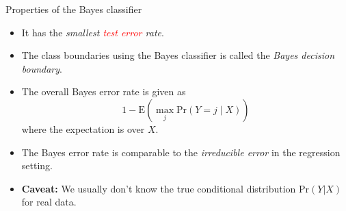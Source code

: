 \documentclass[
  10pt,
  ignorenonframetext,
]{beamer}
\providecommand{\tightlist}{%
  \setlength{\itemsep}{0pt}\setlength{\parskip}{0pt}}
\begin{document}
\begin{frame}
\begin{block}{Properties of the Bayes classifier}
\protect\hypertarget{properties-of-the-bayes-classifier}{}
\(~\)

\begin{itemize}
\tightlist
\item
  It has the \emph{smallest \textcolor{red}{test error} rate}.
\end{itemize}

\vspace{2mm}

\begin{itemize}
\tightlist
\item
  The class boundaries using the Bayes classifier is called the
  \emph{Bayes decision boundary}.
\end{itemize}

\vspace{2mm}

\begin{itemize}
\tightlist
\item
  The overall Bayes error rate is given as
  \[1-\text{E}(\max_j \text{Pr}(Y=j\mid X))\] where the expectation is
  over \(X\).
\end{itemize}

\vspace{2mm}

\begin{itemize}
\tightlist
\item
  The Bayes error rate is comparable to the \emph{irreducible error} in
  the regression setting.
\end{itemize}

\vspace{2mm}

\begin{itemize}
\tightlist
\item
  \textbf{Caveat:} We usually don't know the true conditional
  distribution \(\text{Pr}(Y | X)\) for real data.
\end{itemize}
\end{block}
\end{frame}
\end{document}
